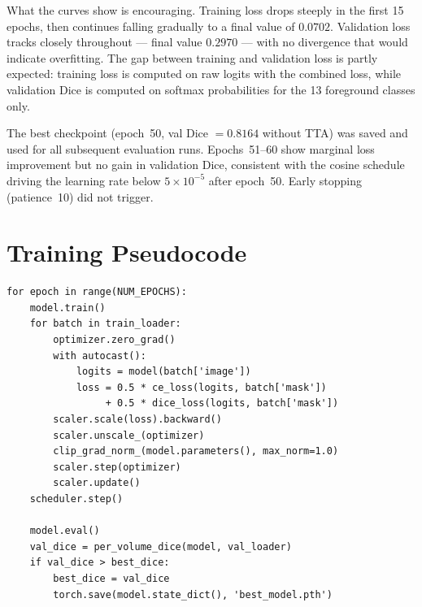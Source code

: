 \FloatBarrier

What the curves show is encouraging. Training loss drops steeply in the first 15 epochs, then
continues falling gradually to a final value of $0.0702$. Validation loss tracks closely
throughout --- final value $0.2970$ --- with no divergence that would indicate overfitting. The
gap between training and validation loss is partly expected: training loss is computed on raw
logits with the combined loss, while validation Dice is computed on softmax probabilities for
the 13 foreground classes only.

The best checkpoint (epoch~50, val Dice $= 0.8164$ without TTA) was saved and used for all
subsequent evaluation runs. Epochs~51--60 show marginal loss improvement but no gain in
validation Dice, consistent with the cosine schedule driving the learning rate below $5 \times
10^{-5}$ after epoch~50. Early stopping (patience~10) did not trigger.

\section{Training Pseudocode}

\begin{verbatim}
for epoch in range(NUM_EPOCHS):
    model.train()
    for batch in train_loader:
        optimizer.zero_grad()
        with autocast():
            logits = model(batch['image'])
            loss = 0.5 * ce_loss(logits, batch['mask'])
                 + 0.5 * dice_loss(logits, batch['mask'])
        scaler.scale(loss).backward()
        scaler.unscale_(optimizer)
        clip_grad_norm_(model.parameters(), max_norm=1.0)
        scaler.step(optimizer)
        scaler.update()
    scheduler.step()

    model.eval()
    val_dice = per_volume_dice(model, val_loader)
    if val_dice > best_dice:
        best_dice = val_dice
        torch.save(model.state_dict(), 'best_model.pth')
\end{verbatim}
